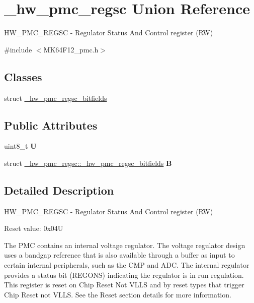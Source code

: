 \hypertarget{union__hw__pmc__regsc}{}\section{\+\_\+hw\+\_\+pmc\+\_\+regsc Union Reference}
\label{union__hw__pmc__regsc}


H\+W\+\_\+\+P\+M\+C\+\_\+\+R\+E\+G\+SC -\/ Regulator Status And Control register (RW)  




{\ttfamily \#include $<$M\+K64\+F12\+\_\+pmc.\+h$>$}

\subsection*{Classes}
\begin{DoxyCompactItemize}
\item 
struct \hyperlink{struct__hw__pmc__regsc_1_1__hw__pmc__regsc__bitfields}{\+\_\+hw\+\_\+pmc\+\_\+regsc\+\_\+bitfields}
\end{DoxyCompactItemize}
\subsection*{Public Attributes}
\begin{DoxyCompactItemize}
\item 
uint8\+\_\+t {\bfseries U}\hypertarget{union__hw__pmc__regsc_a9cbd303299377d0b6f5e6e5dca062f56}{}\label{union__hw__pmc__regsc_a9cbd303299377d0b6f5e6e5dca062f56}

\item 
struct \hyperlink{struct__hw__pmc__regsc_1_1__hw__pmc__regsc__bitfields}{\+\_\+hw\+\_\+pmc\+\_\+regsc\+::\+\_\+hw\+\_\+pmc\+\_\+regsc\+\_\+bitfields} {\bfseries B}\hypertarget{union__hw__pmc__regsc_a84f815d055931105bfa80f141c80097f}{}\label{union__hw__pmc__regsc_a84f815d055931105bfa80f141c80097f}

\end{DoxyCompactItemize}


\subsection{Detailed Description}
H\+W\+\_\+\+P\+M\+C\+\_\+\+R\+E\+G\+SC -\/ Regulator Status And Control register (RW) 

Reset value\+: 0x04U

The P\+MC contains an internal voltage regulator. The voltage regulator design uses a bandgap reference that is also available through a buffer as input to certain internal peripherals, such as the C\+MP and A\+DC. The internal regulator provides a status bit (R\+E\+G\+O\+NS) indicating the regulator is in run regulation. This register is reset on Chip Reset Not V\+L\+LS and by reset types that trigger Chip Reset not V\+L\+LS. See the Reset section details for more information. 

